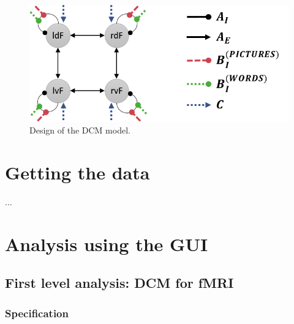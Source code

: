 \documentclass{article}
\begin{document}
\begin{figure}[ht]
\begin{center}
\includegraphics{"Fig_intro_network"}
\caption{Design of the DCM model.\label{Fig_intro_network}}
\end{center}
\end{figure}

\section{Getting the data}
...

\section{Analysis using the GUI}

\subsection{First level analysis: DCM for fMRI}

\subsubsection{Specification} \label{GUI_specification}
\end{document}
